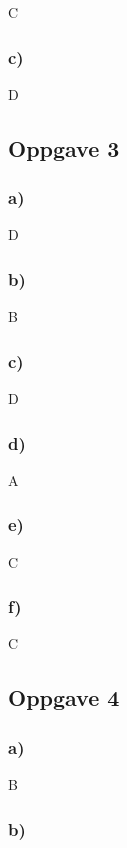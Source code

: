 \documentclass{article}
\begin{document}
C

\subsubsection{c)}

D

\subsection{Oppgave 3}

\subsubsection{a)}

D

\subsubsection{b)}

B

\subsubsection{c)}

D

\subsubsection{d)}

A

\subsubsection{e)}

C

\subsubsection{f)}

C

\subsection{Oppgave 4}

\subsubsection{a)}

B

\subsubsection{b)}
\end{document}
